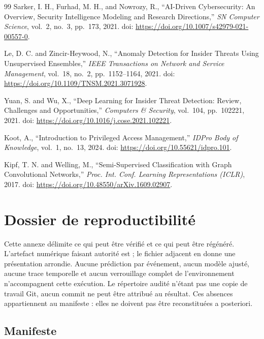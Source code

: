 \documentclass[11pt,a4paper,oneside]{report}
\theoremstyle{definition}
\theoremstyle{plain}
\begin{document}
\begin{thebibliography}{99}
Sarker, I. H., Furhad, M. H., and Nowrozy, R., ``{AI}-Driven Cybersecurity: An Overview, Security Intelligence Modeling and Research Directions,'' \emph{SN Computer Science}, vol.~2, no.~3, pp.~173, 2021. doi: \url{https://doi.org/10.1007/s42979-021-00557-0}.

Le, D. C. and Zincir-Heywood, N., ``Anomaly Detection for Insider Threats Using Unsupervised Ensembles,'' \emph{IEEE Transactions on Network and Service Management}, vol.~18, no.~2, pp.~1152--1164, 2021. doi: \url{https://doi.org/10.1109/TNSM.2021.3071928}.

Yuan, S. and Wu, X., ``Deep Learning for Insider Threat Detection: Review, Challenges and Opportunities,'' \emph{Computers \& Security}, vol.~104, pp.~102221, 2021. doi: \url{https://doi.org/10.1016/j.cose.2021.102221}.

Koot, A., ``Introduction to Privileged Access Management,'' \emph{IDPro Body of Knowledge}, vol.~1, no.~13, 2024. doi: \url{https://doi.org/10.55621/idpro.101}.

Kipf, T. N. and Welling, M., ``Semi-Supervised Classification with Graph Convolutional Networks,'' \emph{Proc. Int. Conf. Learning Representations ({ICLR})}, 2017. doi: \url{https://doi.org/10.48550/arXiv.1609.02907}.

\end{thebibliography}

\appendix

\chapter{Dossier de reproductibilité}
\label{app:reproducibility}

Cette annexe délimite ce qui peut être vérifié et ce qui peut être régénéré.
L'artefact numérique faisant autorité est
 ; le fichier
 adjacent en donne une présentation arrondie. Aucune
prédiction par événement, aucun modèle ajusté, aucune trace temporelle et aucun
verrouillage complet de l'environnement n'accompagnent cette exécution. Le
répertoire audité n'étant pas une copie de travail Git, aucun commit ne peut
être attribué au résultat. Ces absences appartiennent au manifeste : elles ne
doivent pas être reconstituées a posteriori.

\section{Manifeste}
\label{app:manifest}
\end{document}
